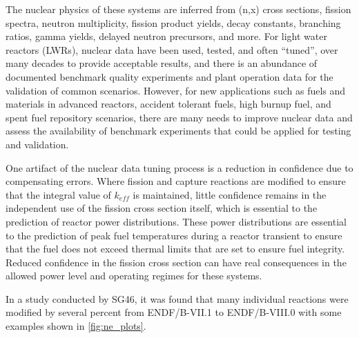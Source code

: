 \documentclass[letterpaper]{ar-1col}
\begin{document}
The nuclear physics of these systems are inferred from (n,x) cross sections, fission spectra, neutron multiplicity, fission product yields, decay constants, branching ratios, gamma yields, delayed neutron precursors, and more.
 For light water reactors (LWRs), nuclear data have been used, tested, and often \enquote{tuned}, over many decades to provide acceptable results, and there is an abundance of documented benchmark quality experiments and plant operation data for the validation of common scenarios.
However, for new applications such as fuels and materials in advanced reactors, accident tolerant fuels, high burnup fuel, and spent fuel repository scenarios, there are many needs to improve nuclear data and assess the availability of benchmark experiments that could be applied for testing and validation.


One artifact of the nuclear data tuning process is a reduction in confidence due to compensating errors.
Where fission and capture reactions are modified to ensure that the integral value of $k_{eff}$ is maintained, little confidence remains in the independent use of the fission cross section itself, which is essential to the prediction of reactor power distributions.
These power distributions are essential to the prediction of peak fuel temperatures during a reactor transient to ensure that the fuel does not exceed thermal limits that are set to ensure fuel integrity.
Reduced confidence in the fission cross section can have real consequences in the allowed power level and operating regimes for these systems.

In a study conducted by SG46, it was found that many individual reactions were modified by several percent from ENDF/B-VII.1 to ENDF/B-VIII.0 with some examples shown in \autoref{fig:ne_plots}.
\end{document}
